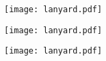 \documentclass{article}
\begin{document}
\begin{center}
  \texttt{[image: lanyard.pdf]}

  \vspace{2em}

  \texttt{[image: lanyard.pdf]}

  \vspace{2em}

  \texttt{[image: lanyard.pdf]}
\end{center}
\end{document}
